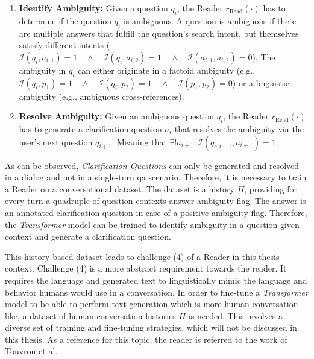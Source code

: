 \begin{enumerate}
    \item \textbf{Identify Ambiguity:} Given a question $q_i$, the Reader $r_{\text{Read}}(\cdot)$ has to determine if the question $q_i$ is ambiguous. A question is ambiguous if there are multiple answers that fulfill the question's search intent, but themselves satisfy different intents ($\mathcal{I}(q_{i}, a_{i,1}) = 1 \quad \allowbreak \land \quad \allowbreak \mathcal{I}(q_{i}, a_{i,2}) = 1 \quad \allowbreak \land \quad \allowbreak \mathcal{I}(a_{i,1},a_{i,2}) = 0$). The ambiguity in $q_i$ can either originate in a factoid ambiguity (e.g., $\mathcal{I}(q_{i}, p_1) = 1 \quad \land \quad \mathcal{I}(q_{i}, p_2) = 1 \quad \land \quad \mathcal{I}(p_1, p_2) = 0$) or a linguistic ambiguity (e.g., ambiguous cross-references).
    \item \textbf{Resolve Ambiguity:} Given an ambiguous question $q_i$, the Reader $r_{\text{Read}}(\cdot)$ has to generate a clarification question $a_i$ that resolves the ambiguity via the user's next question $q_{i+1}$. Meaning that $\exists! a_{i+1} : \mathcal{I}(q_{c,i+1}, a_{i+1}) = 1$.
\end{enumerate}

As can be observed, \textit{Clarification Questions} can only be generated and resolved in a dialog and not in a single-turn \gls{qa} scenario. Therefore, it is necessary to train a Reader on a conversational dataset. The dataset is a history $H$, providing for every turn a quadruple of question-contexts-answer-ambiguity flag. The answer is an annotated clarification question in case of a positive ambiguity flag. Therefore, the \textit{Transformer} model can be trained to identify ambiguity in a question given context and generate a clarification question.

This history-based dataset leads to challenge (4) of a Reader in this thesis context. Challenge (4) is a more abstract requirement towards the reader. It requires the language and generated text to linguistically mimic the language and behavior humans would use in a conversation. In order to fine-tune a \textit{Transformer} model to be able to perform text generation which is more human conversation-like, a dataset of human conversation histories $H$ is needed. This involves a diverse set of training and fine-tuning strategies, which will not be discussed in this thesis. As a reference for this topic, the reader is referred to the work of Touvron et al. \cite{touvron_llama_2023}.


